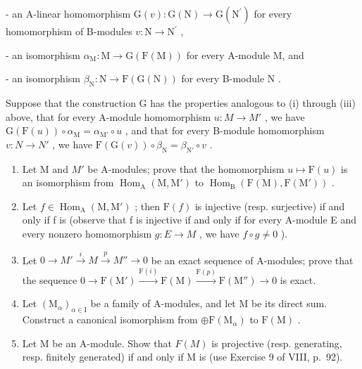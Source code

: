 - an A-linear homomorphism \(\mathrm{G}(v):\mathrm{G}(\mathrm{N})\to \mathrm{G}(\mathrm{N}^{\prime})\) for every homomorphism of B-modules \(v:\mathrm{N}\rightarrow \mathrm{N}^{\prime}\) ,

- an isomorphism \(\alpha_{\mathrm{M}}: \mathrm{M} \to \mathrm{G}(\mathrm{F}(\mathrm{M}))\) for every A-module M, and

- an isomorphism \(\beta_{\mathrm{N}}: \mathrm{N} \to \mathrm{F}(\mathrm{G}(\mathrm{N}))\) for every B-module \(\mathrm{N}\) .

Suppose that the construction G has the properties analogous to (i) through (iii) above, that for every A-module homomorphism \(u: M \to M'\) , we have \(\mathrm{G}(\mathrm{F}(u)) \circ \alpha_{\mathrm{M}} = \alpha_{\mathrm{M}'} \circ u\) , and that for every B-module homomorphism \(v: N \to N'\) , we have \(\mathrm{F}(\mathrm{G}(v)) \circ \beta_{\mathrm{N}} = \beta_{\mathrm{N}'} \circ v\) .

\begin{enumerate}
\def\labelenumi{\alph{enumi})}
\item
  Let M and \(M'\) be A-modules; prove that the homomorphism \(u \mapsto \mathrm{F}(u)\) is an isomorphism from \(\operatorname{Hom}_{\mathrm{A}}(\mathrm{M}, \mathrm{M}')\) to \(\operatorname{Hom}_{\mathrm{B}}(\mathrm{F}(\mathrm{M}), \mathrm{F}(\mathrm{M}'))\) .
\item
  Let \(f \in \operatorname{Hom}_{\mathrm{A}}(\mathrm{M}, \mathrm{M}')\) ; then \(\mathrm{F}(f)\) is injective (resp. surjective) if and only if f is (observe that f is injective if and only if for every A-module E and every nonzero homomorphism \(g : E \to M\) , we have \(f \circ g \neq 0\) ).
\item
  Let \(0 \to M' \xrightarrow{i} M \xrightarrow{p} M'' \to 0\) be an exact sequence of A-modules; prove that the sequence \(0 \to \mathrm{F}(\mathrm{M}') \xrightarrow{\mathrm{F}(i)} \mathrm{F}(\mathrm{M}) \xrightarrow{\mathrm{F}(p)} \mathrm{F}(\mathrm{M}'') \to 0\) is exact.
\item
  Let \((\mathrm{M}_{\alpha})_{\alpha\in\mathrm{I}}\) be a family of A-modules, and let M be its direct sum. Construct a canonical isomorphism from \(\oplus\mathrm{F}(\mathrm{M}_{\alpha})\) to \(\mathrm{F}(\mathrm{M})\) .
\item
  Let M be an A-module. Show that \(F(M)\) is projective (resp. generating, resp. finitely generated) if and only if M is (use Exercise 9 of VIII, p.~92).
\end{enumerate}

